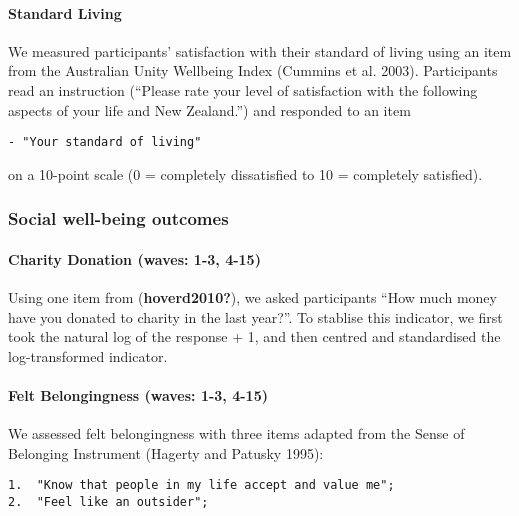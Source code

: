 \documentclass[
  letterpaper,
  DIV=11,
  numbers=noendperiod]{scrartcl}
\let\oldparagraph\paragraph
\renewcommand{\paragraph}[1]{\oldparagraph{#1}\mbox{}}
\begin{document}
\hypertarget{standard-living}{%
\paragraph{Standard Living}\label{standard-living}}

We measured participants' satisfaction with their standard of living
using an item from the Australian Unity Wellbeing Index (Cummins et al.
2003). Participants read an instruction (``Please rate your level of
satisfaction with the following aspects of your life and New Zealand.'')
and responded to an item

\begin{verbatim}
- "Your standard of living"
\end{verbatim}

on a 10-point scale (0 = completely dissatisfied to 10 = completely
satisfied).

\hypertarget{social-well-being-outcomes}{%
\subsubsection{Social well-being
outcomes}\label{social-well-being-outcomes}}

\hypertarget{charity-donation-waves-1-3-4-15}{%
\paragraph{Charity Donation (waves: 1-3,
4-15)}\label{charity-donation-waves-1-3-4-15}}

Using one item from (\textbf{hoverd2010?}), we asked participants ``How
much money have you donated to charity in the last year?''. To stablise
this indicator, we first took the natural log of the response + 1, and
then centred and standardised the log-transformed indicator.

\hypertarget{felt-belongingness-waves-1-3-4-15}{%
\paragraph{Felt Belongingness (waves: 1-3,
4-15)}\label{felt-belongingness-waves-1-3-4-15}}

We assessed felt belongingness with three items adapted from the Sense
of Belonging Instrument (Hagerty and Patusky 1995):

\begin{verbatim}
1.  "Know that people in my life accept and value me";
2.  "Feel like an outsider";
\end{verbatim}
\end{document}
